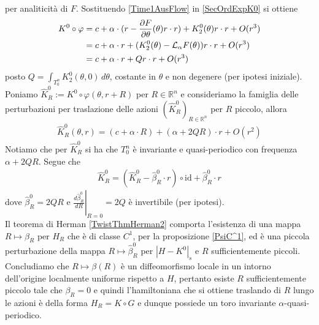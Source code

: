 \documentclass[twoside, 11pt]{amsbook}
\makeatletter
\newcommand{\0}{{(0)}}
\newcommand{\3}{{(3)}}
\theoremstyle{colonplain}
\theoremstyle{colondefinition}
\theoremstyle{colonremark}
\numberwithin{equation}{chapter}
\renewcommand{\proofname}{Dimostrazione}
\renewenvironment{proof}[1][\proofname]{\par
  \pushQED{\qed}%
  \normalfont \topsep6\p@\@plus6\p@\relax
  \trivlist
  \item[\hskip\labelsep\bfseries #1:]\ignorespaces
}{%
  \popQED\endtrivlist\@endpefalse
}
\makeatother
\begin{document}
\begin{proof}
per analiticità di $F$. Sostituendo \eqref{Time1AusFlow} in \eqref{SecOrdExpK0} si ottiene
\begin{align}
    K^0 \circ \varphi &= c + \alpha \cdot (r - \frac{\partial F}{\partial \theta}(\theta)r \cdot r) + K^0_2(\theta)r \cdot r + O(r^3) \notag \\
    &= c + \alpha \cdot r + (K^0_2(\theta) - \mathcal{L}_\alpha F(\theta))r \cdot r + O(r^3) \notag \\
    &= c + \alpha \cdot r + Qr \cdot r + O(r^3) 
\end{align}
posto $Q = \int_{T^n_0} K^0_2(\theta, 0) \, d\theta$, costante in $\theta$ e non degenere (per ipotesi iniziale). \\
Poniamo $\widehat{K}^0_R := K^0 \circ \varphi (\theta, r + R)$ per $R \in \mathbb{R}^n$ e consideriamo la famiglia delle perturbazioni per traslazione delle azioni $(\widehat{K}^0_R)_{R \in \mathbb{R}^n}$ per $R$ piccolo, allora
\begin{align}
    \widehat{K}^0_R(\theta, r) = (c + \alpha \cdot R) + (\alpha + 2QR) \cdot r + O(r^2)
\end{align}
Notiamo che per $\widehat{K}^0_R$ si ha che $T^n_0$ è invariante e quasi-periodico con frequenza $\alpha + 2QR$. Segue che
\begin{align}
    \widehat{K}^0_R = (\widehat{K}^0_R - \widehat{\beta}^0_R \cdot r) \circ \mathrm{id} + \widehat{\beta}^0_R \cdot r
\end{align}
dove $\widehat{\beta}^0_R = 2QR$ e $\left.\frac{d\widehat{\beta}^0_R}{dR}\right|_{R = 0} = 2Q$ è invertibile (per ipotesi). \\
Il teorema di Herman \ref{TwistThmHerman2} comporta l'esistenza di una mappa $R \mapsto \beta_R$ per $H_R$ che è di classe $C^1$, per la proposizione \ref{PsiC^1}, ed è una piccola perturbazione della mappa $R \mapsto \widehat{\beta}^0_R$ per $|H - K^0|_s$ e $R$ sufficientemente piccoli. \\
Concludiamo che $R \mapsto \beta(R)$ è un diffeomorfismo locale in un intorno dell'origine localmente uniforme rispetto a $H$, pertanto esiste $R$ sufficientemente piccolo tale che $\beta_R = 0$ e quindi l'hamiltoniana che si ottiene traslando di $R$ lungo le azioni è della forma $H_R = K \circ G$ e dunque possiede un toro invariante $\alpha$-quasi-periodico. \end{proof}

\appendix
\end{document}
